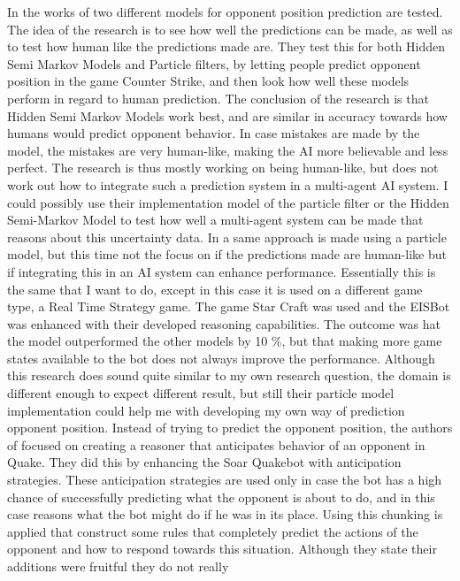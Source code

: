 \documentclass[a4paper, 12pt]{article}
\begin{document}
In the works of \citep{Hladky_anevaluation} two different models for opponent
position prediction are tested. The idea of the research is to see how well the
predictions can be made, as well as to test how human like the predictions made
are. They test this for both Hidden Semi Markov Models and Particle filters, by
letting people predict opponent position in the game Counter Strike, and then
look how well these models perform in regard to human prediction. The conclusion
of the research is that Hidden Semi Markov Models work best, and are similar in
accuracy towards how humans would predict opponent behavior. In case mistakes
are made by the model, the mistakes are very human-like, making the AI more
believable and less perfect. The research is thus mostly working on being
human-like, but does not work out how to integrate such a prediction system in a
multi-agent AI system. I could possibly use their implementation model of the
particle filter or the Hidden Semi-Markov Model to test how well a multi-agent
system can be made that reasons about this uncertainty data.  
In \citep{weber2011aiide} a same approach is made using a particle model, but this
time not the focus on if the predictions made are human-like but if integrating
this in an AI system can enhance performance. Essentially this is the same that
I want to do, except in this case it is used on a different game type, a Real
Time Strategy game. The game Star Craft was used and the EISBot was enhanced
with their developed reasoning capabilities. The outcome was hat the model
outperformed the other models by 10 \%, but that making more game states
available to the bot does not always improve the performance. Although this
research does sound quite similar to my own research question, the domain is
different enough to expect different result, but still their particle model
implementation could help me with developing my own way of prediction opponent
position.  
Instead of trying to predict the opponent position, the authors
of \citep{Laird:2001:KYG:375735.376343} focused on creating a reasoner that
anticipates behavior of an opponent in Quake. They did this by enhancing the
Soar Quakebot with anticipation strategies. These anticipation strategies are
used only in case the bot has a high chance of successfully predicting what the
opponent is about to do, and in this case reasons what the bot might do if he
was in its place. Using this chunking is applied that construct some rules that
completely predict the actions of the opponent and how to respond towards this
situation. Although they state their additions were fruitful they do not really
\end{document}
